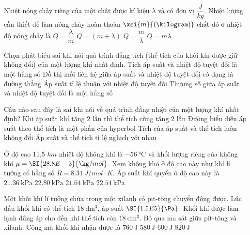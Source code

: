 \begin{ex}
	Nhiệt nóng chảy riêng của một chất được kí hiệu $\lambda$ và có đơn vị $\dfrac{J}{kg}$. Nhiệt lượng cần thiết để làm nóng chảy hoàn thoàn $\xsi{m}{\left(\kilogram\right)}$ chất đó ở nhiệt độ nóng chảy là 
	\choice
	{$Q=\dfrac{\lambda}{m}$}
	{$Q=(m+\lambda)$}
	{$Q=\dfrac{m}{\lambda}$}
	{\True $Q=m\lambda$}
	\loigiai{}
\end{ex}
\begin{ex}
	Chọn phát biểu sai khi nói quá trình đẳng tích (thể tích của khối khí được giữ không đổi) của một lượng khí nhất định.
	\choice
	{\True Tích áp suất và nhiệt độ tuyệt đối là một hằng số}
	{Đồ thị mối liên hệ giữa áp suất và nhiệt độ tuyệt đối có dạng là đường thẳng}
	{Áp suất tỉ lệ thuận với nhiệt độ tuyệt đối}
	{Thương số giữa áp suất và nhiệt độ tuyệt đối là một hằng số}
	\loigiai{}
\end{ex}
\begin{ex}
	Câu nào sau đây là sai khi nói về quá trình đẳng nhiệt của một lượng khí nhất định?
	\choice
	{\True Khi áp suất khí tăng 2 lần thì thể tích cũng tăng 2 lần}
	{Đường biểu diễn áp suất theo thể tích là một phần của hyperbol}
	{Tích của áp suất và thể tích luôn không đổi}
	{Áp suất và thể tích tỉ lệ nghịch với nhau}
	\loigiai{}
\end{ex}
\begin{ex}
	Ở độ cao 11,5 $\si{km}$ nhiệt độ không khí là $\SI{-56}{\celsius}$ và khối lượng riêng của không khí $\mu = \SI{28.8E-3}{\kg/mol}$. Xem không khó ở độ cao này như khí lí tưởng có hằng số $R=\SI{8.31}{J/mol\cdot K}$. Âp suất khí quyển ở độ cao này là
	\choice
	{$\SI{21.36}{\kPa}$}
	{$\SI{22.80}{\kPa}$}
	{$\SI{21.64}{\kPa}$}
	{\True $\SI{22.54}{\kPa}$}
\end{ex}
\begin{ex}
	Một khối khí lí tưởng chứa trong một xilanh có pit-tông chuyển động được. Lúc đầu khối khí có thể tích $\SI{18}{\dm^3}$, áp suất $\SI{1.5E5}{\Pa}$. Khối khí được làm lạnh đẳng áp cho đến khi thể tích còn $\SI{18}{\dm^3}$. Bỏ qua ma sát giữa pit-tông và xilanh. Công mà khối khí nhận được là
	\choice
	{$\SI{760}{\J}$}
	{$\SI{580}{\J}$}
	{\True $\SI{600}{\J}$}
	{$\SI{820}{\J}$}
\end{ex}
